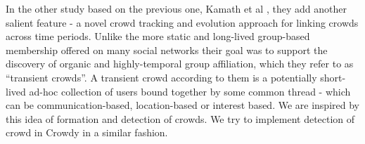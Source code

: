 \documentclass{sig-alternate}
\begin{document}
In the other study based on the previous one, Kamath et al
\cite{krishna:2011}, they add another salient feature - a novel crowd tracking
and evolution approach for linking crowds across time periods. Unlike the more
static and long-lived group-based membership offered on many social networks
their goal was to support the discovery of organic and highly-temporal group
affiliation, which they refer to as ``transient crowds''. A transient crowd
according to them is a potentially short-lived ad-hoc collection of users bound
together by some common thread - which can be communication-based,
location-based or interest based. We are inspired by this idea of formation and
detection of crowds. We try to implement detection of crowd in Crowdy in a
similar fashion.

\end{document}
